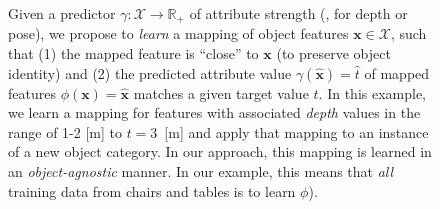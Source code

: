 \documentclass[10pt,twocolumn,letterpaper]{article}
\begin{document}
\begin{figure}[t!]
\caption{\label{fig:intro} Given a predictor $\gamma: \mathcal{X} \to \mathbb{R}_+$ of attribute
strength (\eg, for depth or pose), we propose to \emph{learn} a mapping 
of object features $\mathbf{x} \in \mathcal{X}$, such that
(1) the mapped feature is ``close'' to $\mathbf{x}$ (to preserve object identity) and (2) the predicted 
attribute value $\gamma(\hat{\mathbf{x}}) = \hat{t}$ of mapped features 
$\phi(\mathbf{x}) = \hat{\mathbf{x}}$
matches a given target value $t$. In this example,
we learn a mapping for features with associated \emph{depth} values in the
range of 1-2 [m] to $t=3$~[m] and apply that mapping to an instance of a new 
object category. In our approach, this mapping is learned in 
an \emph{object-agnostic} manner. In our example, this means that
\emph{all} training data from chairs and tables is to learn $\phi$).}
\end{figure}
\end{document}
